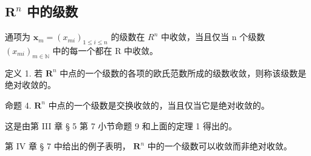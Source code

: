 \subsection{\texorpdfstring{\(\mathbf{R}^n\) 中的级数}{R 的 n 次幂中的级数}}

通项为 \(\boldsymbol{x}_{m} = (x_{mi})_{1 \leqslant i \leqslant n}\) 的级数在 \(R^{n}\) 中收敛，当且仅当 n 个级数 \((x_{mi})_{m \in \mathbb{N}}\) 中的每一个都在 R 中收敛。

定义 1. 若 \(\mathbf{R}^n\) 中点的一个级数的各项的欧氏范数所成的级数收敛，则称该级数是绝对收敛的。

命题 4. \(\mathbf{R}^n\) 中点的一个级数是交换收敛的，当且仅当它是绝对收敛的。

这是由第 III 章 § 5 第 7 小节命题 9 和上面的定理 1 得出的。

第 IV 章 § 7 中给出的例子表明， \(\mathbf{R}^n\) 中的一个级数可以收敛而非绝对收敛。
\relax{}
\ExerciseGroupsStart
